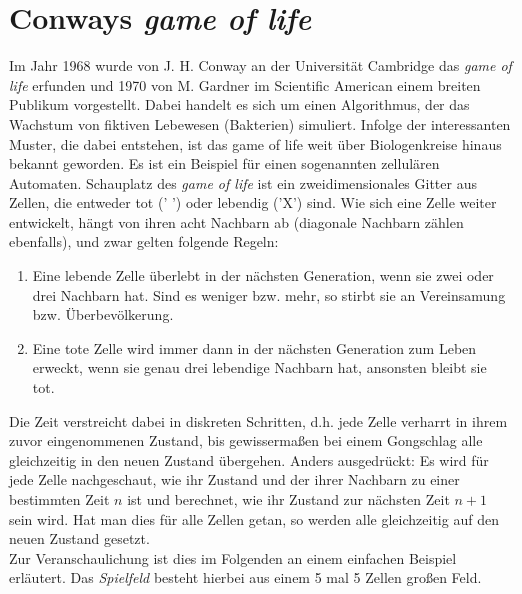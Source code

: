 
\section{Conways \textit{game of life}}

Im Jahr 1968 wurde von J. H. Conway an der Universität Cambridge das \textit{game of life} erfunden und 1970 von M. Gardner im Scientific American einem breiten Publikum vorgestellt. Dabei handelt es sich um einen Algorithmus, der das Wachstum von fiktiven Lebewesen (Bakterien) simuliert. Infolge der interessanten Muster, die dabei entstehen, ist das game of life weit über Biologenkreise hinaus bekannt geworden. Es ist ein Beispiel für einen sogenannten zellulären Automaten. Schauplatz des \textit{game of life} ist ein zweidimensionales Gitter aus Zellen, die entweder tot (' ') oder lebendig ('X') sind. Wie sich eine Zelle weiter entwickelt, hängt von ihren acht Nachbarn ab (diagonale Nachbarn zählen ebenfalls), und zwar gelten folgende Regeln:

\begin{enumerate}[label=\arabic*]
	\item Eine lebende Zelle überlebt in der nächsten Generation, wenn sie zwei oder drei Nachbarn hat. Sind es weniger bzw. mehr, so stirbt sie an Vereinsamung bzw. Überbevölkerung.
	\item Eine tote Zelle wird immer dann in der nächsten Generation zum Leben erweckt, wenn sie genau drei lebendige Nachbarn hat, ansonsten bleibt sie tot.
\end{enumerate}

Die Zeit verstreicht dabei in diskreten Schritten, d.h. jede Zelle verharrt in ihrem zuvor eingenommenen Zustand, bis gewissermaßen bei einem Gongschlag alle gleichzeitig in den neuen Zustand übergehen. Anders ausgedrückt: Es wird für jede Zelle nachgeschaut, wie ihr Zustand und der ihrer Nachbarn zu einer bestimmten Zeit $n$ ist und berechnet, wie ihr Zustand zur nächsten Zeit $n + 1$ sein wird. Hat man dies für alle Zellen getan, so werden alle gleichzeitig auf den neuen Zustand gesetzt. \\
Zur Veranschaulichung ist dies im Folgenden an einem einfachen Beispiel erläutert. Das \textit{Spielfeld} besteht hierbei aus einem 5 mal 5 Zellen großen Feld.

